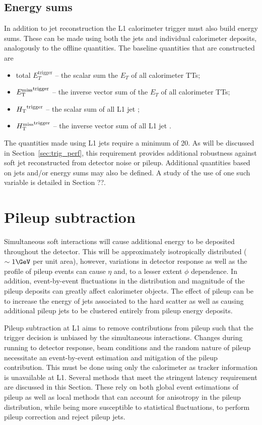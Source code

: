 \subsection{Energy sums}

In addition to jet reconstruction the L1 calorimeter trigger must also build energy sums. 
These can be made using both the jets and individual calorimeter deposits, analogously to
the offline quantities. The baseline quantities that are constructed are

\begin{itemize}
\item total $E^{\text{trigger}}_{T}$ -- the scalar sum the $E_T$ of all calorimeter TTs;
\item $\mbox{$E_\text{T}^{\rm miss}$}^{\text{trigger}}$ -- the inverse vector sum of the $E_T$ of all calorimeter TTs;
\item $\mbox{$H_\text{T}$}^{\text{trigger}}$ -- the scalar sum of all L1 jet \pt;
\item $\mbox{$H_{\rm T}^{\rm miss}$}^{\text{trigger}}$ -- the inverse vector sum of all L1 jet \pt.
\end{itemize}

The quantities made using L1 jets require a minimum \Lonept of 20\GeV. As will be discussed in 
Section~\ref{sec:trig_perf}, this requirement provides additional robustness against soft
jet reconstructed from detector noise or pileup. Additional quantities based 
on jets and/or energy sums may also be defined. A study of the use of one such variable is detailed in Section ??.

\section{Pileup subtraction}
\label{sec:pileup_algo}
Simultaneous soft interactions will cause additional energy to be deposited throughout
the detector. This will be approximately isotropically distributed ($\sim1\GeV$ per unit area), however, variations
in detector response as well as the profile of pileup events can cause $\eta$ and,
to a lesser extent $\phi$ dependence. In addition, event-by-event fluctuations in the distribution 
and magnitude of the pileup deposits can greatly affect calorimeter objects. 
The effect of pileup can be to increase the energy of jets associated to the hard 
scatter as well as causing additional pileup jets
to be clustered entirely from pileup energy deposits.

Pileup subtraction at L1 aims to remove contributions from pileup such that the trigger
decision is unbiased by the simultaneous interactions. Changes during running
to detector response, beam conditions and the random nature of pileup necessitate an event-by-event
estimation and mitigation of the pileup contribution. This must be done using only the calorimeter as 
tracker information is unavailable at L1. Several methods that meet the stringent latency requirement
are discussed in this Section. These rely on both global event estimations of pileup as well as 
local methods that can account for anisotropy in the pileup distribution, while being more susceptible 
to statistical fluctuations, to perform pileup correction and reject pileup jets.

